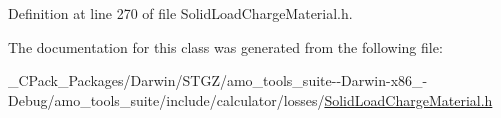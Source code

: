 Definition at line 270 of file Solid\+Load\+Charge\+Material.\+h.



The documentation for this class was generated from the following file\+:\begin{DoxyCompactItemize}
\item 
\+\_\+\+C\+Pack\+\_\+\+Packages/\+Darwin/\+S\+T\+G\+Z/amo\+\_\+tools\+\_\+suite-\/-\/\+Darwin-\/x86\+\_-\/\+Debug/amo\+\_\+tools\+\_\+suite/include/calculator/losses/\hyperlink{___c_pack___packages_2_darwin_2_s_t_g_z_2amo__tools__suite--_darwin-x86__64-_debug_2amo__tools__2d69b31c5507c4cbb51ea1996df0276b}{Solid\+Load\+Charge\+Material.\+h}\end{DoxyCompactItemize}
